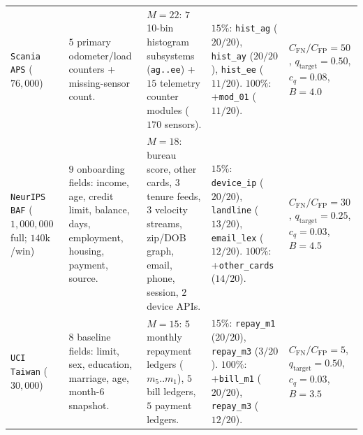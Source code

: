 \documentclass[11pt]{article}
\theoremstyle{remark}
\begin{document}
\begin{table}[h!]
{\begin{tabular}{l>{\raggedright\arraybackslash}p{3.9cm}>{\raggedright\arraybackslash}p{4.9cm}>{\raggedright\arraybackslash}p{4.8cm}l}
\texttt{Scania APS} ($76{,}000$) & $5$ primary odometer/load counters + missing-sensor count. & $M=22$: $7$ 10-bin histogram subsystems (\texttt{ag..ee}) + $15$ telemetry counter modules ($170$ sensors). & $15\%$: \texttt{hist\_ag} ($20/20$), \texttt{hist\_ay} ($20/20$), \texttt{hist\_ee} ($11/20$). $100\%$: +\texttt{mod\_01} ($11/20$). & $C_{\text{FN}}/C_{\text{FP}}=50$, $q_{\text{target}}=0.50$, $c_q=0.08$, $B=4.0$ \\
\addlinespace[2pt]
\texttt{NeurIPS BAF} ($1{,}000{,}000$ full; $140\text{k}$/win) & $9$ onboarding fields: income, age, credit limit, balance, days, employment, housing, payment, source. & $M=18$: bureau score, other cards, $3$ tenure feeds, $3$ velocity streams, zip/DOB graph, email, phone, session, $2$ device APIs. & $15\%$: \texttt{device\_ip} ($20/20$), \texttt{landline} ($13/20$), \texttt{email\_lex} ($12/20$). $100\%$: +\texttt{other\_cards} ($14/20$). & $C_{\text{FN}}/C_{\text{FP}}=30$, $q_{\text{target}}=0.25$, $c_q=0.03$, $B=4.5$ \\
\addlinespace[2pt]
\texttt{UCI Taiwan} ($30{,}000$) & $8$ baseline fields: limit, sex, education, marriage, age, month-6 snapshot. & $M=15$: $5$ monthly repayment ledgers ($m_5..m_1$), $5$ bill ledgers, $5$ payment ledgers. & $15\%$: \texttt{repay\_m1} ($20/20$), \texttt{repay\_m3} ($3/20$). $100\%$: +\texttt{bill\_m1} ($20/20$), \texttt{repay\_m3} ($12/20$). & $C_{\text{FN}}/C_{\text{FP}}=5$, $q_{\text{target}}=0.50$, $c_q=0.03$, $B=3.5$ \\
\bottomrule
\end{tabular}%
}
\end{table}
\end{document}
